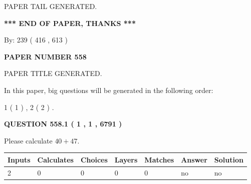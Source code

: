 \documentclass[12pt]{article}
\begin{document}
   
   
\vspace{2.0in} PAPER TAIL GENERATED.
   
   
   
   
\vspace{1.0in} 
{\textbf{\large{ *** END OF PAPER, THANKS *** }}} 
   
   
\hspace{1.0in} By: 
 239 ( 416 ,  613 )
   
   
   
   
\newpage 
\setcounter{page}{ 
   558001 } 
   
   
   
   
 {\textbf{ \Large{ PAPER NUMBER  558  }}}
   
   
\vspace{0.2in}
   
   
   
   
   
   
   
   
 \vspace{0.2in}
 
 
 
 
   
   
 PAPER TITLE GENERATED.
   
   
   
\vspace{0.2in}
   
In this paper, big questions will be generated in the following order: 
   
   
   1 ( 1 )
 ,
   2 ( 2 )
 .
  
\vspace{0.2in}
  
{\textbf{\Large{QUESTION
558.1 
 ( 1 , 1 , 6791 )
}}}
  
  
 
Please calculate $ %
40 +  %
47 $.
 
 
   
   
   
   
\noindent\begin{tabular}{|l|l|l|l|l|l|l|}
 \hline
Inputs & Calculates & Choices & Layers & Matches & Answer & Solution \\ \hline
 2  & 
 0  & 
 0
  & 
 0  & 
 0  & 
  no & 
  no 
  \\ \hline
 \end{tabular}
   
\end{document}
